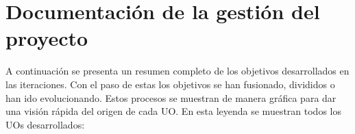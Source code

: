 
\section{Documentación de la gestión del proyecto}
\label{dgp}

A continuación se presenta un resumen completo de los objetivos desarrollados en las iteraciones. Con el paso de estas los objetivos se han fusionado, divididos o han ido evolucionando. Estos procesos se muestran de manera gráfica para dar una visión rápida del origen de cada UO. En esta leyenda se muestran todos los UOs desarrollados:\\

\vspace{0.1cm}

\noindent
{}\\

\vspace{0.1cm}

\noindent
{}\\

\vspace{0.1cm}

